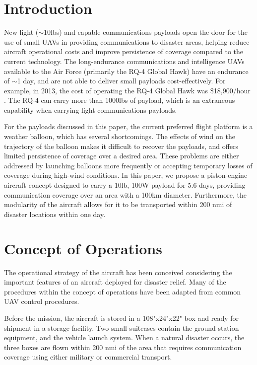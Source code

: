 \documentclass[journal]{aiaa-tc}%
\begin{document}
\section{Introduction}
\label{Introduction}
New light ($\sim$10lbs) and capable communications payloads open the door for the use of small UAVs in providing communications to disaster areas, helping reduce aircraft operational costs and improve persistence of coverage compared to the current technology. The long-endurance communications and intelligence UAVs available to the Air Force (primarily the RQ-4 Global Hawk) have an endurance of  $\sim$1 day, and are not able to deliver small payloads cost-effectively. For example, in 2013, the cost of operating the RQ-4 Global Hawk was \$18,900/hour \cite{costGlobalHawk}. The RQ-4 can carry more than 1000lbs of payload, which is an extraneous capability when carrying light communications payloads. 

For the payloads discussed in this paper, the current preferred flight platform is a weather balloon, which has several shortcomings. The effects of wind on the trajectory of the balloon makes it difficult to recover the payloads, and offers limited persistence of coverage over a desired area. These problems are either addressed by launching balloons more frequently or accepting temporary losses of coverage during high-wind conditions. In this paper, we propose a piston-engine aircraft concept designed to carry a 10lb, 100W payload for 5.6 days, providing communication coverage over an area with a 100km diameter. Furthermore, the modularity of the aircraft allows for it to be transported within 200 nmi of disaster locations within one day.

\section{Concept of Operations}
\label{Concept of Operations}

The operational strategy of the aircraft has been conceived considering the important features of an aircraft deployed for disaster relief. Many of the procedures within the concept of operations have been adapted from common UAV control procedures. 

Before the mission, the aircraft is stored in a 108"x24"x22" box and ready for shipment in a storage facility. Two small suitcases contain the ground station equipment, and the vehicle launch system. When a natural disaster occurs, the three boxes are flown within 200 nmi of the area that requires communication coverage using either military or commercial transport. 
\end{document}

